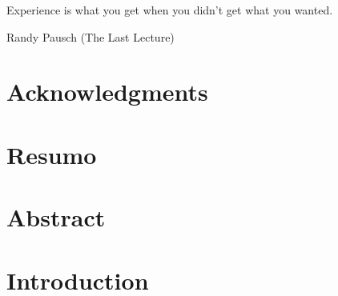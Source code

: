 \documentclass[11pt,a4paper,twoside]{book} %
\begin{document}
	
	\thispagestyle{empty}
	
	
	\newpage
	\thispagestyle{plain}
	
	\newpage
	\thispagestyle{plain}
	\mbox{}
	
	
	\thispagestyle{empty}

	\vspace*{0.8\textheight}
	\setlength{\epigraphwidth}{9cm}
	\renewcommand{\textflush}{flushright}
	\epigraph{Experience is what you get when you didn’t get what you wanted.}
	            {Randy Pausch (The Last Lecture)}

	\cleardoublepage
	
	\chapter*{Acknowledgments}
	

	\newpage
	\thispagestyle{plain}
	\mbox{}
		
	\chapter*{Resumo}
	
	
	\newpage
	\thispagestyle{plain}
	\mbox{}
	
	\chapter*{Abstract}
	
	
	\newpage
	\thispagestyle{plain}
	\mbox{}
	
	\tableofcontents{}
	
	\newpage
	\thispagestyle{plain}
	\mbox{}
	
	\cleardoublepage
	\listoffigures
	\newpage
	\thispagestyle{plain}
	\mbox{}	
	\cleardoublepage
	\listoftables

	\chapter*{}
	\newpage
	

	
\chapter{Introduction}
   
   \mbox{}
\end{document}
